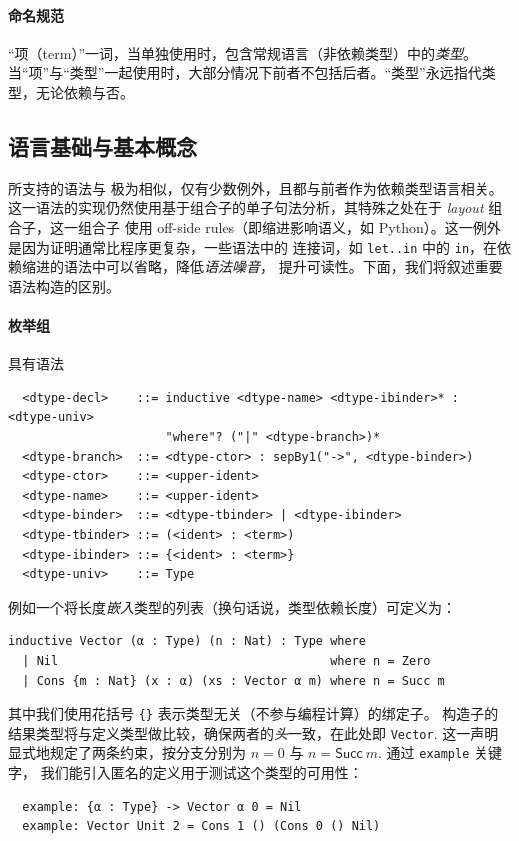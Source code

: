 \documentclass[a4paper, 11pt]{article}
\theoremstyle{remark}\newtheorem*{remark}{Remark}
\theoremstyle{definition}\newtheorem*{definition}{Definition}
\begin{document}
\paragraph{命名规范} “项（term）”一词，当单独使用时，包含常规语言（非依赖类型）中的\emph{类型}。
当“项”与“类型”一起使用时，大部分情况下前者不包括后者。“类型”永远指代类型，无论依赖与否。

\subsection{语言基础与基本概念}
\Tigrisd 所支持的语法与 \Tigris 极为相似，仅有少数例外，且都与前者作为依赖类型语言相关。
这一语法的实现仍然使用基于组合子的单子句法分析，其特殊之处在于 \emph{layout} 组合子，这一组合子
使用 off-side rules（即缩进影响语义，如 Python）。这一例外是因为证明通常比程序更复杂，一些语法中的
连接词，如 \texttt{let..in} 中的 \texttt{in}，在依赖缩进的语法中可以省略，降低\emph{语法噪音}，
提升可读性。下面，我们将叙述重要语法构造的区别。

\paragraph{枚举组} 具有语法
\begin{verbatim}
  <dtype-decl>    ::= inductive <dtype-name> <dtype-ibinder>* : <dtype-univ>
                      "where"? ("|" <dtype-branch>)*
  <dtype-branch>  ::= <dtype-ctor> : sepBy1("->", <dtype-binder>)
  <dtype-ctor>    ::= <upper-ident>
  <dtype-name>    ::= <upper-ident>
  <dtype-binder>  ::= <dtype-tbinder> | <dtype-ibinder>
  <dtype-tbinder> ::= (<ident> : <term>)
  <dtype-ibinder> ::= {<ident> : <term>}
  <dtype-univ>    ::= Type
\end{verbatim}

例如一个将长度\emph{嵌入}类型的列表（换句话说，类型依赖长度）可定义为：

\begin{verbatim}
inductive Vector (α : Type) (n : Nat) : Type where
  | Nil                                      where n = Zero
  | Cons {m : Nat} (x : α) (xs : Vector α m) where n = Succ m
\end{verbatim}
其中我们使用花括号 \texttt{\{\}} 表示类型无关（不参与编程计算）的绑定子。
构造子的结果类型将与定义类型做比较，确保两者的\emph{头}一致，在此处即 \texttt{Vector}.
这一声明显式地规定了两条约束，按分支分别为 $n = 0$ 与 $n = \mathsf{Succ}\ m$. 通过 \texttt{example} 关键字，
我们能引入匿名的定义用于测试这个类型的可用性：

\begin{verbatim}
  example: {α : Type} -> Vector α 0 = Nil
  example: Vector Unit 2 = Cons 1 () (Cons 0 () Nil)
\end{verbatim}
\end{document}

